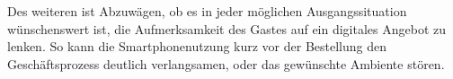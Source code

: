 Des weiteren ist Abzuwägen, ob es in jeder möglichen Ausgangssituation wünschenswert ist, die Aufmerksamkeit des Gastes auf ein digitales Angebot zu lenken. So kann die Smartphonenutzung kurz vor der Bestellung den Geschäftsprozess deutlich verlangsamen, oder das gewünschte Ambiente stören. 


